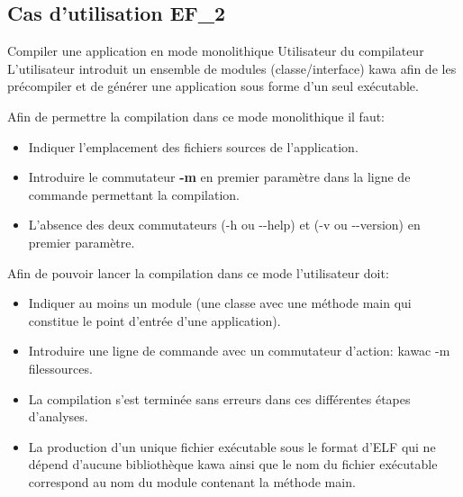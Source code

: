 \subsection{Cas d'utilisation EF\_2}
\fiche
{Compiler une application en mode monolithique}                    %
{Utilisateur du compilateur}                               %
{                                                %
  L'utilisateur introduit un ensemble de modules (classe/interface)
  kawa afin de les précompiler et de générer une application sous forme d'un seul exécutable.
}
{
	Afin de permettre la compilation dans ce mode monolithique il faut:
	\begin{itemize}
  	\item Indiquer l’emplacement des fichiers sources de l'application.
  	\item Introduire le commutateur  \textbf {-m}  en premier paramètre dans la ligne de commande permettant la compilation.
  	\item L'absence des deux commutateurs (-h ou -\hspace{0.1mm}-help) et (-v ou -\hspace{0.1mm}-version) en premier paramètre.
  	\end {itemize}
}                                                %
{

Afin de pouvoir lancer la compilation dans ce mode l'utilisateur  doit: 
\begin{itemize}
  	\item Indiquer au moins un module (une classe avec une méthode main qui constitue le point d'entrée d'une application).
  	\item Introduire une ligne de commande avec un commutateur d'action: kawac -m filessources.
 \end {itemize}

}    %
{
	\begin{itemize}
  	\item La compilation s'est terminée sans erreurs dans ces différentes étapes d’analyses.
  	\item La production d’un unique fichier exécutable sous le format d'ELF  qui ne dépend d'aucune bibliothèque kawa ainsi que le nom du fichier exécutable correspond au nom du module contenant la méthode main.
\end {itemize}
  
}  %
{                                                %
  
}

